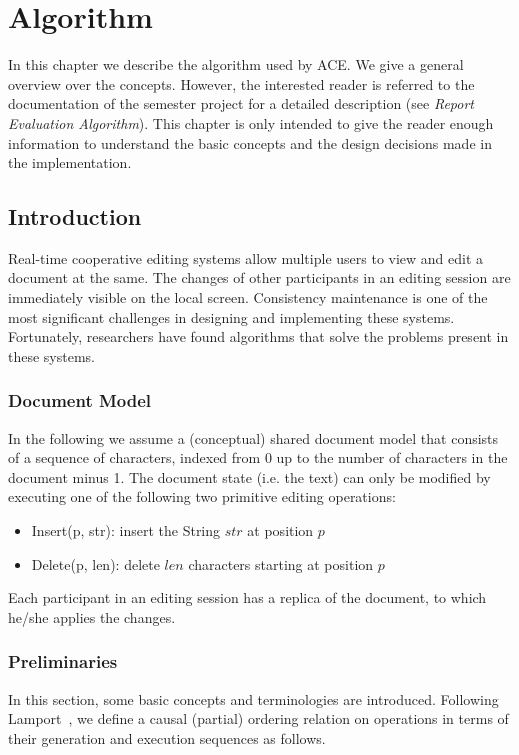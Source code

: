 \chapter{Algorithm}
\label{chapter:algorithm}

In this chapter we describe the algorithm used by ACE. We give a general
overview over the concepts. However, the interested reader is referred to
the documentation of the semester project for a detailed description (see 
\emph{Report Evaluation Algorithm}). This chapter is only intended to give
the reader enough information to understand the basic concepts and the
design decisions made in the implementation.



\section{Introduction}
Real-time cooperative editing systems allow multiple users to view and edit a
document at the same. The changes of other participants in an editing
session are immediately visible on the local screen. Consistency maintenance
is one of the most significant challenges in designing and implementing
these systems. Fortunately, researchers have found algorithms that solve the
problems present in these systems.


\subsection{Document Model}
In the following we assume a (conceptual) shared document model that consists 
of a sequence of characters, indexed from 0 up to the number of characters in
the document minus 1. The document state (i.e. the text) can only be 
modified by executing one of the following two primitive editing operations:

\begin{itemize}
 \item Insert(p, str): insert the String $str$ at position $p$
 \item Delete(p, len): delete $len$ characters starting at position $p$
\end{itemize}

Each participant in an editing session has a replica of the document, to which
he/she applies the changes.


\subsection{Preliminaries}
In this section, some basic concepts and terminologies are introduced. Following Lamport~\cite{lamport78}, we define a causal (partial) ordering relation on operations in terms of their generation and execution sequences as follows.

